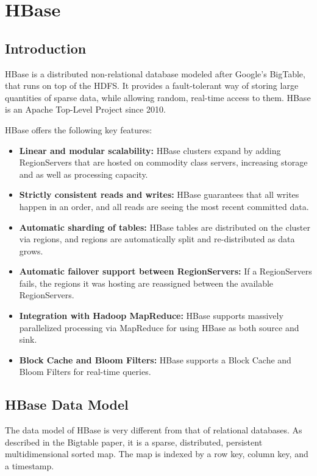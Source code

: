 \section{HBase}
\subsection{Introduction}

HBase is a distributed non-relational database modeled after Google's BigTable, that runs on top of the HDFS. It provides a fault-tolerant way of storing large quantities of sparse data, while allowing random, real-time access to them. HBase is an Apache Top-Level Project since 2010.

HBase offers the following key features:
\begin{itemize}
\item \textbf{Linear and modular scalability:} HBase clusters expand by adding RegionServers that are hosted on commodity class servers, increasing storage and as well as processing capacity.
\item \textbf{Strictly consistent reads and writes:} HBase guarantees that all writes happen in an order, and all reads are seeing the most recent committed data.
\item \textbf{Automatic sharding of tables:} HBase tables are distributed on the cluster via regions, and regions are automatically split and re-distributed as data grows.
\item \textbf{Automatic failover support between RegionServers:} If a RegionServers fails, the regions it was hosting are reassigned between the available RegionServers.
\item \textbf{Integration with Hadoop MapReduce:} HBase supports massively parallelized processing via MapReduce for using HBase as both source and sink.
\item \textbf{Block Cache and Bloom Filters:} HBase supports a Block Cache and Bloom Filters for real-time queries.
\end{itemize}

\subsection{HBase Data Model}

The data model of HBase is very different from that of relational databases. As described in the  Bigtable paper, it is a sparse, distributed, persistent multidimensional sorted map. The map is indexed by a row key, column key, and a timestamp.

